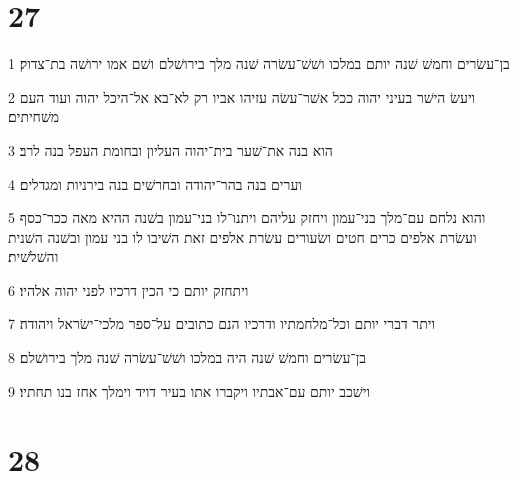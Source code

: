 \chapter{27}

\par 1 בן־עשׂרים וחמשׁ שׁנה יותם במלכו ושׁשׁ־עשׂרה שׁנה מלך בירושׁלם ושׁם אמו ירושׁה בת־צדוק׃
\par 2 ויעשׂ הישׁר בעיני יהוה ככל אשׁר־עשׂה עזיהו אביו רק לא־בא אל־היכל יהוה ועוד העם משׁחיתים׃
\par 3 הוא בנה את־שׁער בית־יהוה העליון ובחומת העפל בנה לרב׃
\par 4 וערים בנה בהר־יהודה ובחרשׁים בנה בירניות ומגדלים׃
\par 5 והוא נלחם עם־מלך בני־עמון ויחזק עליהם ויתנו־לו בני־עמון בשׁנה ההיא מאה ככר־כסף ועשׂרת אלפים כרים חטים ושׂעורים עשׂרת אלפים זאת השׁיבו לו בני עמון ובשׁנה השׁנית והשׁלשׁית׃
\par 6 ויתחזק יותם כי הכין דרכיו לפני יהוה אלהיו׃
\par 7 ויתר דברי יותם וכל־מלחמתיו ודרכיו הנם כתובים על־ספר מלכי־ישׂראל ויהודה׃
\par 8 בן־עשׂרים וחמשׁ שׁנה היה במלכו ושׁשׁ־עשׂרה שׁנה מלך בירושׁלם׃
\par 9 וישׁכב יותם עם־אבתיו ויקברו אתו בעיר דויד וימלך אחז בנו תחתיו׃

\chapter{28}

